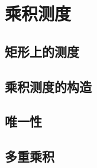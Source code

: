 \section{乘积测度}
\label{b1:sec:0702}


\subsection{矩形上的测度}
\label{b1:subsec:070201}

\subsection{乘积测度的构造}
\label{b1:subsec:070202}

\subsection{唯一性}
\label{b1:subsec:070203}

\subsection{多重乘积}
\label{b1:subsec:070204}


